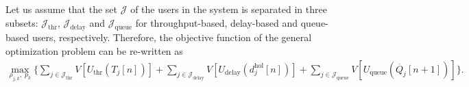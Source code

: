 \begin{apendicesenv}
Let us assume that the set $\mathcal{J}$ of the users in the system is separated in three subsets: $\mathcal{J}_{\mathrm{thr}}$, $\mathcal{J}_{\mathrm{delay}}$ and $\mathcal{J}_{\mathrm{queue}}$ for throughput-based, delay-based and queue-based users, respectively. 
Therefore, the objective function of the general optimization problem can be re-written as
%
\small
\begin{align}
\label{JSM:Eq:Util_Opt_Joint_Mix2_App}
\underset{\rho_{j,k},\;p_{k}}{\text{max}} \; \Bigg\{ \sum_{j \in \mathcal{J}_{\mathrm{thr}}} V\left[U_{\mathrm{thr}}\left(T_{j}\left[n\right]\right)\right] + \sum_{j \in \mathcal{J}_{\mathrm{delay}}} V\left[U_{\mathrm{delay}}\left(d_{j}^\mathrm{hol}\left[n\right]\right)\right] + \sum_{j \in \mathcal{J}_{\mathrm{queue}}} V\left[U_{\mathrm{queue}}\left(\overline{Q}_{j}\left[n+1\right]\right)\right]  \Bigg\}.
\end{align}
\normalsize


\end{apendicesenv}
